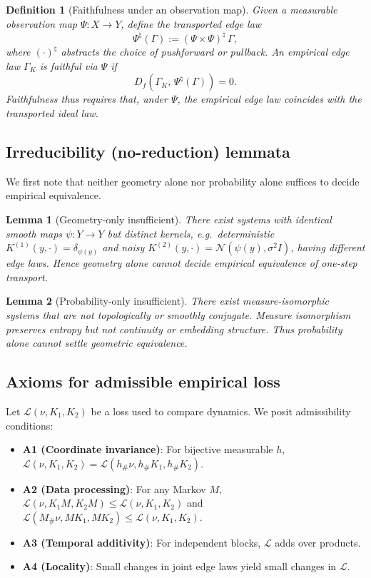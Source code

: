 \documentclass[11pt]{article}
\newtheorem{definition}{Definition}
\newtheorem{lemma}{Lemma}
\newcommand{\1}{\mathbf{1}}
\newcommand{\push}{\#}
\begin{document}
\begin{definition}[Faithfulness under an observation map]
Given a measurable observation map $\Psi:X \to Y$, define the transported edge law
\[
  \Psi^{\natural}(\Gamma) := (\Psi \times \Psi)^{\natural}\,\Gamma,
\]
where $(\cdot)^{\natural}$ abstracts the choice of pushforward or pullback.  
An empirical edge law $\Gamma_K$ is \emph{faithful via $\Psi$} if
\[
  D_f\!\left(\Gamma_K,\,\Psi^{\natural}(\Gamma)\right) = 0.
\]
Faithfulness thus requires that, under $\Psi$, the empirical edge law coincides with the transported ideal law. 
\end{definition}

\subsection{Irreducibility (no-reduction) lemmata}
We first note that neither geometry alone nor probability alone suffices to decide empirical equivalence.

\begin{lemma}[Geometry-only insufficient]\label{lem:G}
There exist systems with identical smooth maps $\psi:Y\to Y$ but distinct kernels, e.g.\ 
deterministic $K^{(1)}(y,\cdot)=\delta_{\psi(y)}$ and noisy 
$K^{(2)}(y,\cdot)=\mathcal N(\psi(y),\sigma^2 I)$, 
having different edge laws. Hence geometry alone cannot decide empirical equivalence 
of one-step transport.
\end{lemma}

\begin{lemma}[Probability-only insufficient]\label{lem:P}
There exist measure-isomorphic systems that are not topologically or smoothly conjugate. 
Measure isomorphism preserves entropy but not continuity or embedding structure. 
Thus probability alone cannot settle geometric equivalence.
\end{lemma}

\subsection{Axioms for admissible empirical loss}
Let $\mathcal L(\nu,K_1,K_2)$ be a loss used to compare dynamics. We posit admissibility conditions:
\begin{itemize}[leftmargin=1.7em,itemsep=2pt,topsep=2pt]
\item \textbf{A1 (Coordinate invariance)}: For bijective measurable $h$,
$\mathcal L(\nu,K_1,K_2)=\mathcal L(h_\push\nu,h_\push K_1,h_\push K_2)$.
\item \textbf{A2 (Data processing)}: For any Markov $M$,
$\mathcal L(\nu,K_1M,K_2M)\le \mathcal L(\nu,K_1,K_2)$ and 
$\mathcal L(M_\push\nu,MK_1,MK_2)\le \mathcal L(\nu,K_1,K_2)$.
\item \textbf{A3 (Temporal additivity)}: For independent blocks, $\mathcal L$ adds over products.
\item \textbf{A4 (Locality)}: Small changes in joint edge laws yield small changes in $\mathcal L$.
\end{itemize}
\end{document}
